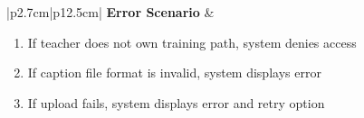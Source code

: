 \begin{table}[H]
\begin{tabular}{|p{2.7cm}|p{12.5cm}|}
        \textbf{Error Scenario} & \begin{minipage}[t]{\linewidth}
                                      \begin{enumerate}[topsep=0pt,itemsep=1pt,parsep=0pt,partopsep=0pt]
                                          \item If teacher does not own training path, system denies access
                                          \item If caption file format is invalid, system displays error
                                          \item If upload fails, system displays error and retry option
                                      \end{enumerate}
                                  \end{minipage} \\
        \hline
    \end{tabular}
    \label{tab:teacher-captions}
\end{table}







